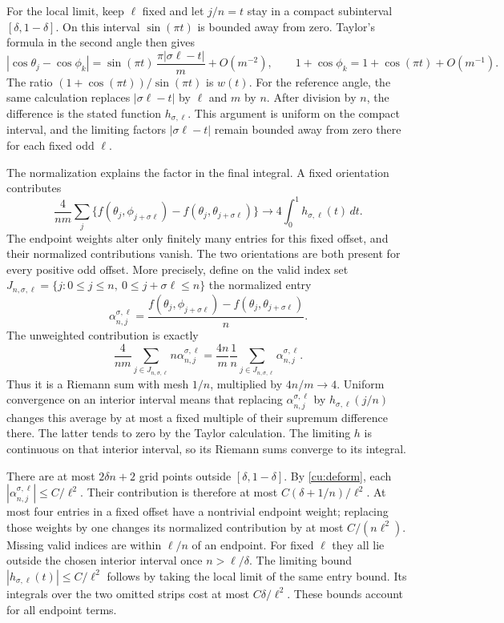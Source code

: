 For the local limit, keep $\ell$ fixed and let $j/n=t$ stay in
a compact subinterval $[\delta,1-\delta]$. On this interval
$\sin(\pi t)$ is bounded away from zero. Taylor's formula in the
second angle then gives
\[
 |\cos\theta_j-\cos\phi_k|
  =\sin(\pi t)\,\frac{\pi|\sigma\ell-t|}{m}
       +O(m^{-2}),\qquad
 1+\cos\phi_k=1+\cos(\pi t)+O(m^{-1}).
\]
The ratio $(1+\cos(\pi t))/\sin(\pi t)$ is $w(t)$.
For the reference angle, the same calculation replaces
$|\sigma\ell-t|$ by $\ell$ and $m$ by $n$.
After division by $n$, the difference is the stated function
$h_{\sigma,\ell}$. This argument is uniform on the compact
interval, and the limiting factors $|\sigma\ell-t|$ remain bounded away
from zero there for each fixed odd $\ell$.

The normalization explains the factor in the final integral. A fixed
orientation contributes
\[
 \frac4{nm}\sum_j
   \{f(\theta_j,\phi_{j+\sigma\ell})
             -f(\theta_j,\theta_{j+\sigma\ell})\}
 \longrightarrow4\int_0^1h_{\sigma,\ell}(t)\,dt.
\]
The endpoint weights alter only finitely many entries for this fixed
offset, and their normalized contributions vanish. The two
orientations are both present for every positive odd offset.
More precisely, define on the valid index set
$J_{n,\sigma,\ell}=\{j:0\leq j\leq n,\ 0\leq j+\sigma\ell\leq n\}$
the normalized entry
\[
 \alpha_{n,j}^{\sigma,\ell}
  =\frac{f(\theta_j,\phi_{j+\sigma\ell})
                    -f(\theta_j,\theta_{j+\sigma\ell})}{n}.
\]
The unweighted contribution is exactly
\[
 \frac4{nm}\sum_{j\in J_{n,\sigma,\ell}}n \alpha_{n,j}^{\sigma,\ell}
 =\frac{4n}{m}\frac1n
                \sum_{j\in J_{n,\sigma,\ell}}\alpha_{n,j}^{\sigma,\ell}.
\]
Thus it is a Riemann sum with mesh $1/n$, multiplied by
$4n/m\to4$. Uniform convergence on an interior interval means
that replacing $\alpha_{n,j}^{\sigma,\ell}$ by
$h_{\sigma,\ell}(j/n)$ changes this average by at most a fixed
multiple of their supremum difference there. The latter tends to
zero by the Taylor calculation. The limiting $h$ is continuous
on that interior interval, so its Riemann sums converge to its
integral.

There are at most $2\delta n+2$ grid points outside
$[\delta,1-\delta]$. By \eqref{cu:deform}, each
$|\alpha_{n,j}^{\sigma,\ell}|\leq C/\ell^2$. Their contribution
is therefore at most $C(\delta+1/n)/\ell^2$.
At most four entries in a fixed offset have a nontrivial endpoint
weight; replacing those weights by one changes its normalized
contribution by at most $C/(n\ell^2)$. Missing valid indices are
within $\ell/n$ of an endpoint. For fixed $\ell$ they all lie
outside the chosen interior interval once $n>\ell/\delta$.
The limiting bound $|h_{\sigma,\ell}(t)|\leq C/\ell^2$
follows by taking the local limit of the same entry bound.
Its integrals over the two omitted strips cost at most
$C\delta/\ell^2$. These bounds account for all endpoint terms.

